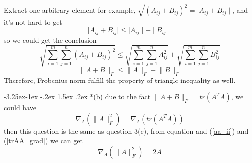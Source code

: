 \documentclass[12pt]{article}
\makeatletter
\renewcommand\subsection{\@startsection{subsection}{2}{\z@}%
	{-3.25ex\@plus -1ex \@minus -.2ex}%
	{1.5ex \@plus .2ex}%
	{\normalfont\large\bfseries}}%
\makeatother
\begin{document}
	Extract one arbitrary element for example, $\sqrt{(A_{ij}+B_{ij})^2}=\mid A_{ij}+B_{ij}\mid$, and it's not hard to get 
	\begin{equation}
	\mid A_{ij}+B_{ij}\mid \le \mid A_{ij}\mid +\mid B_{ij}\mid
	\end{equation}
	so we could get the conclusion 
	\begin{equation}
	\sqrt{\sum_{i=1}^m\sum_{j=1}^n(A_{ij}+B_{ij})^2} \le \sqrt{\sum_{i=1}^m\sum_{j=1}^n A_{ij}^2} + \sqrt{\sum_{i=1}^m\sum_{j=1}^n B_{ij}^2}
	\end{equation}
	\begin{equation}
	\lVert A+B\rVert_F\le \lVert A\rVert_F+\lVert B\rVert_F
	\end{equation}
	Therefore, Frobenius norm fulfill the property of triangle inequality as well.
	
	\subsection*{(b)}
	due to the fact $\lVert A+B\rVert_F=tr(A^TA)$, we could have
	\begin{equation}\label{trAA_from}
	\nabla_A(\lVert A\rVert_F^2)=\nabla_A(tr(A^TA))
	\end{equation}
	then this question is the same as question 3(c), from equation and (\ref{aa_ii}) and (\ref{trAA_grad})
	we can get
	\begin{equation}\label{trAA_from_final}
	\nabla_A(\lVert A\rVert_F^2)=2A
	\end{equation}
	
	
\end{document}
